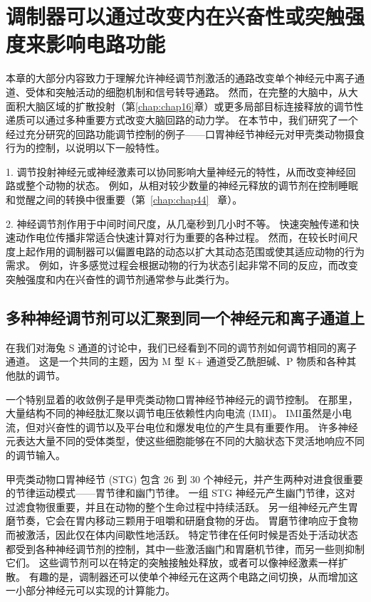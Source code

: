 \section{调制器可以通过改变内在兴奋性或突触强度来影响电路功能}

本章的大部分内容致力于理解允许神经调节剂激活的通路改变单个神经元中离子通道、受体和突触活动的细胞机制和信号转导通路。
然而，在完整的大脑中，从大面积大脑区域的扩散投射（第\ref{chap:chap16}章）或更多局部目标连接释放的调节性递质可以通过多种重要方式改变大脑回路的动力学。
在本节中，我们研究了一个经过充分研究的回路功能调节控制的例子——口胃神经节神经元对甲壳类动物摄食行为的控制，以说明以下一般特性。


1. 调节投射神经元或神经激素可以协同影响大量神经元的特性，从而改变神经回路或整个动物的状态。
例如，从相对较少数量的神经元释放的调节剂在控制睡眠和觉醒之间的转换中很重要（第~\ref{chap:chap44} ~章）。 


2. 神经调节剂作用于中间时间尺度，从几毫秒到几小时不等。
快速突触传递和快速动作电位传播非常适合快速计算对行为重要的各种过程。
然而，在较长时间尺度上起作用的调制器可以偏置电路的动态以扩大其动态范围或使其适应动物的行为需求。
例如，许多感觉过程会根据动物的行为状态引起非常不同的反应，而改变突触强度和内在兴奋性的调节剂通常参与此类行为。



\subsection{多种神经调节剂可以汇聚到同一个神经元和离子通道上}

在我们对海兔 S 通道的讨论中，我们已经看到不同的调节剂如何调节相同的离子通道。
这是一个共同的主题，因为 M 型 K+ 通道受乙酰胆碱、P 物质和各种其他肽的调节。


一个特别显着的收敛例子是甲壳类动物口胃神经节神经元的调节控制。
在那里，大量结构不同的神经肽汇聚以调节电压依赖性内向电流 (IMI)。
IMI虽然是小电流，但对兴奋性的调节以及平台电位和爆发电位的产生具有重要作用。
许多神经元表达大量不同的受体类型，使这些细胞能够在不同的大脑状态下灵活地响应不同的调节输入。


甲壳类动物口胃神经节 (STG) 包含 26 到 30 个神经元，并产生两种对进食很重要的节律运动模式——胃节律和幽门节律。
一组 STG 神经元产生幽门节律，这对过滤食物很重要，并且在动物的整个生命过程中持续活跃。
另一组神经元产生胃磨节奏，它会在胃内移动三颗用于咀嚼和研磨食物的牙齿。
胃磨节律响应于食物而被激活，因此仅在体内间歇性地活跃。
特定节律在任何时候是否处于活动状态都受到各种神经调节剂的控制，其中一些激活幽门和胃磨机节律，而另一些则抑制它们。
这些调节剂可以在特定的突触接触处释放，或者可以像神经激素一样扩散。
有趣的是，调制器还可以使单个神经元在这两个电路之间切换，从而增加这一小部分神经元可以实现的计算能力。


